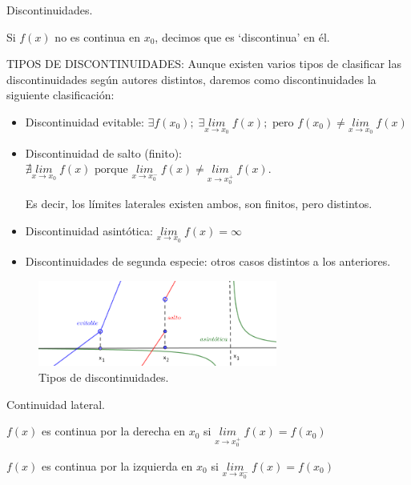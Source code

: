 	\begin{defi}Discontinuidades.
	
	Si $f(x)$ no es continua en $x_0$, decimos que es `discontinua' en él.
	
	\vspace{4mm}TIPOS DE DISCONTINUIDADES: Aunque existen varios tipos de clasificar las discontinuidades según autores distintos, daremos como discontinuidades la siguiente clasificación:
	
	\begin{itemize}
		\item Discontinuidad evitable: $\exists f(x_0);\; \exists \underset{x\to x_0}{lim}\;{f(x)}; \mbox{ pero }f(x_0)\neq\underset{x\to x_0}{lim}\;{f(x)}$
		\item Discontinuidad de salto (finito): $\nexists \underset{x\to x_0}{lim}\;{f(x)} \mbox{ porque } \underset{x\to x_0^-}{lim}\;{f(x)}\neq \underset{x\to x_0^+}{lim}\;{f(x)}$. 
		
		Es decir, los límites laterales existen ambos, son finitos, pero distintos.
		\item Discontinuidad asintótica: $\underset{x\to x_0}{lim}\;{f(x)}=\infty$
		\item Discontinuidades de segunda especie: otros casos distintos a los anteriores.
	\end{itemize}
		
	\end{defi}

	\begin{figure}[H]
		\centering
		\includegraphics[width=0.7\textwidth]{imagenes/imagenes03/T03IM10.png}
		\caption{Tipos de discontinuidades.}
	\end{figure}

	\begin{defi}Continuidad lateral.
	
		$f(x)$ es continua por la derecha en $x_0$ si $\underset {x\to x_0^+}{lim}\;{f(x)}=f(x_0)$
		
		$f(x)$ es continua por la izquierda en $x_0$ si $\underset {x\to x_0^-}{lim}\;{f(x)}=f(x_0)$
		
	\end{defi}

